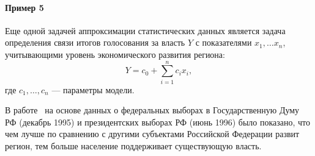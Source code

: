 \paragraph*{Пример 5}

Еще одной задачей аппроксимации статистических данных является задача
определения связи итогов голосования за власть \( Y \) с показателями \( x_1, \ldots x_n \),
учитывающими уровень экономического развития региона:
\begin{equation}
  Y = c_0 + \sum_{i=1}^n c_i x_i,
\end{equation}
где \( c_1, \ldots, c_n \) --- параметры модели.

В работе~\cite{mau98} на основе данных о федеральных выборах в Государственную Думу РФ
(декабрь 1995) и президентских выборах РФ (июнь 1996) было показано, что
чем лучше по сравнению с другими субъектами Российской Федерации развит регион,
тем больше население поддерживает существующую власть.
